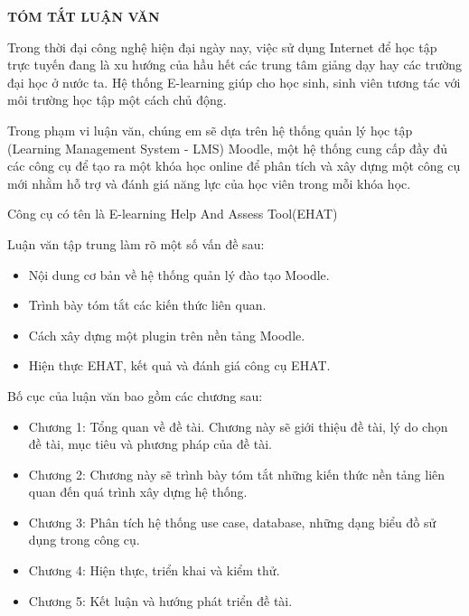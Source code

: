 \centerline{\bf \large\MakeUppercase{Tóm tắt luận văn}}
\vspace{20pt}

Trong thời đại công nghệ hiện đại ngày nay, việc sử dụng Internet để học tập trực tuyến đang là xu hướng của hầu hết các trung tâm giảng dạy hay các trường đại học ở nước ta. Hệ thống E-learning giúp cho học sinh, sinh viên tương tác với môi trường học tập một cách chủ động.

Trong phạm vi luận văn, chúng em sẽ dựa trên hệ thống quản lý học tập (Learning Management System - LMS) Moodle, một hệ thống cung cấp đầy đủ các công cụ để tạo ra một khóa học online để phân tích và xây dựng một công cụ mới nhằm hỗ trợ và đánh giá năng lực của học viên trong mỗi khóa học. 

Công cụ có tên là E-learning Help And Assess Tool(EHAT)

Luận văn tập trung làm rõ một số vấn đề sau:
\begin{itemize}
	\item Nội dung cơ bản về hệ thống quản lý đào tạo Moodle.
	\item Trình bày tóm tắt các kiến thức liên quan.
	\item Cách xây dựng một plugin trên nền tảng Moodle.
	\item Hiện thực EHAT, kết quả và đánh giá công cụ EHAT.
\end{itemize}

Bố cục của luận văn bao gồm các chương sau:
\begin{itemize}
	\item Chương 1: Tổng quan về đề tài. Chương này sẽ giới thiệu đề tài, lý do chọn đề tài, mục tiêu và phương pháp của đề tài.
	\item Chương 2: Chương này sẽ trình bày tóm tắt những kiến thức nền tảng liên quan đến quá trình xây dựng hệ thống.
	\item Chương 3: Phân tích hệ thống use case, database, những dạng biểu đồ sử dụng trong công cụ.
	\item Chương 4: Hiện thực, triển khai và kiểm thử.
	\item Chương 5: Kết luận và hướng phát triển đề tài.
\end{itemize}
